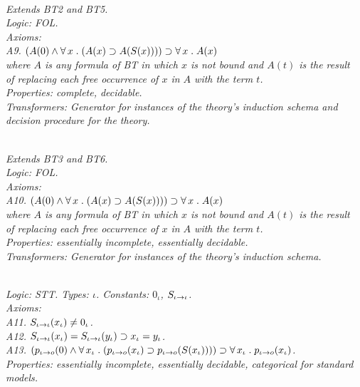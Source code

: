 \documentclass[fleqn]{llncs}
\begin{document}
\begin{biformthy}\em\ \\
Extends BT2 and BT5.\\
\emph{Logic}: FOL.\\
\emph{Axioms}:\\
\indent A9. $(A(0) \wedge \forall\, x \mathrel. (A(x) \supset A(S(x))))
\supset \forall\, x \mathrel. A(x)$\\
\indent 
where $A$ is any formula of BT{\thebiformthy} in which $x$ is not bound and $A(t)$ 
is the result\\
\indent
of replacing each free occurrence of $x$ in $A$ with the term $t$.\\
\emph{Properties}: complete, decidable.\\
\emph{Transformers}: Generator for instances of the theory's induction schema 
and decision procedure for the theory.
\end{biformthy}

\begin{biformthy}\em\ \\
Extends BT3 and BT6.\\ 
\emph{Logic}: FOL.\\
\emph{Axioms}:\\
\indent A10. $(A(0) \wedge \forall\, x \mathrel. (A(x) \supset A(S(x))))
\supset \forall\, x \mathrel. A(x)$\\
\indent 
where $A$ is any formula of BT{\thebiformthy} in which $x$ is not bound and $A(t)$
is the result\\
\indent
of replacing each free occurrence of $x$ in $A$ with the term $t$.\\
\emph{Properties}: essentially incomplete, essentially decidable.\\
\emph{Transformers}: Generator for instances of the theory's induction schema.
\end{biformthy}

\begin{biformthy}\em\ \\
\emph{Logic}: STT. \emph{Types}: $\iota$. 
\emph{Constants}: $0_\iota$, $S_{\iota \rightarrow \iota}$.\\
\emph{Axioms}:\\
\indent A11. $S_{\iota \rightarrow \iota}(x_\iota) \not= 0_\iota$.\\
\indent A12. $S_{\iota \rightarrow \iota}(x_\iota) = S_{\iota \rightarrow \iota}(y_\iota) 
\supset x_\iota = y_\iota$.\\
\indent A13. $(p_{\iota \rightarrow o}(0) \wedge 
\forall\, x_\iota \mathrel. (p_{\iota \rightarrow o}(x_\iota) 
\supset p_{\iota \rightarrow o}(S(x_\iota)))) 
\supset \forall\, x_\iota \mathrel. p_{\iota \rightarrow o}(x_\iota)$.\\
\emph{Properties}: essentially incomplete, essentially decidable, categorical for standard models.
\end{biformthy}
\end{document}
